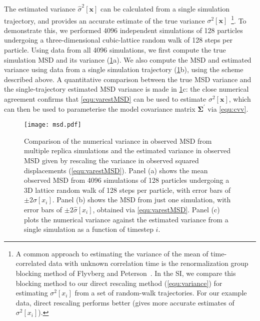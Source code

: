 \documentclass[reprint,superscriptaddress,nobibnotes,amsmath,amssymb,aps,prx,hidelinks]{revtex4-2}
\newcommand{\oMSD}{\ensuremath{\bm{x}}}
\newcommand{\oMSDi}{\ensuremath{x_i}}
\newcommand{\var}[1]{\ensuremath{\sigma^2[#1]}}
\newcommand{\varest}[1]{\ensuremath{\widehat{\sigma}^2[#1]}}
\begin{document}
The estimated variance $\varest{\oMSD}$ can be calculated from a single simulation trajectory, and provides an accurate estimate of the true variance $\var{\oMSD}$~\footnote{A common approach to estimating the variance of the mean of time-correlated data with unknown correlation time is the renormalization group blocking method of Flyvberg and Peterson~\cite{FlyvbjergAndPetersen_JChemPhys1989,Frenkel2023-ah}. In the SI, we compare this blocking method to our direct rescaling method (\cref{equ:variance}) for estimating $\var{\oMSDi}$ from a set of random-walk trajectories. For our example data, direct rescaling performs better (gives more accurate estimates of $\var{\oMSDi}$).}.
To demonstrate this, we performed \num{4096} independent simulations of \num{128} particles undergoing a three-dimensional cubic-lattice random walk of \num{128} steps per particle.
Using data from all \num{4096} simulations, we first compute the true simulation MSD and its variance (\cref{fig:msd}a).
We also compute the MSD and estimated variance using data from a single simulation trajectory (\cref{fig:msd}b), using the scheme described above.
A quantitative comparison between the true MSD variance and the single-trajectory estimated MSD variance is made in \cref{fig:msd}c: the close numerical agreement confirms that \cref{equ:varestMSD} can be used to estimate $\var{\oMSD}$, which can then be used to parameterise the model covariance matrix $\mathbf{\Sigma^\prime}$ via \cref{equ:cvv}.
\begin{figure}
    \centering
    \texttt{[image: msd.pdf]}
    \caption{
        Comparison of the numerical variance in observed MSD from multiple replica simulations and the estimated variance in observed MSD given by rescaling the variance in observed squared displacements (\cref{equ:varestMSD}).
        Panel (a) shows the mean observed MSD from \num{4096} simulations of \num{128} particles undergoing a 3D lattice random walk of \num{128} steps per particle, with error bars of $\pm2\sigma[\oMSDi]$.
        Panel (b) shows the MSD from just one simulation, with error bars of $\pm2\widehat{\sigma}[\oMSDi]$, obtained via \cref{equ:varestMSD}.
        Panel (c) plots the numerical variance against the estimated variance from a single simulation as a function of timestep $i$.
    }
    \label{fig:msd}
\end{figure}
\end{document}
